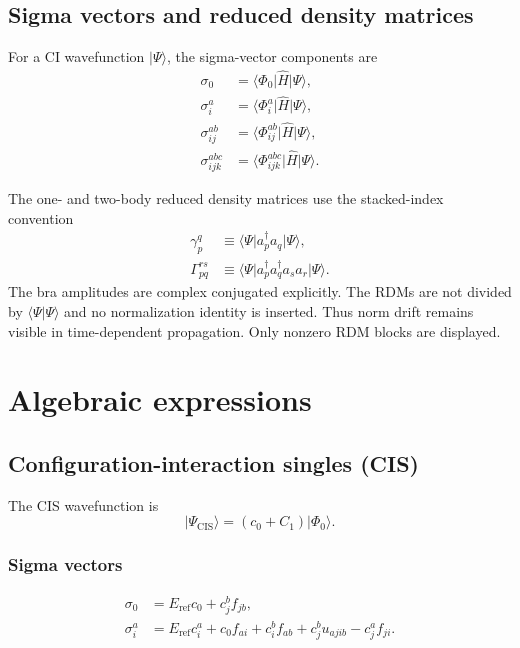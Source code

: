 \documentclass[11pt]{article}
\newcommand{\Eref}{E_{\mathrm{ref}}}
\newcommand{\cre}[1]{a_{#1}^{\dagger}}
\newcommand{\ann}[1]{a_{#1}}
\newcommand{\vac}{\Phi_0}
\begin{document}
\subsection{Sigma vectors and reduced density matrices}

For a CI wavefunction $\lvert\Psi\rangle$, the sigma-vector components are
\begin{align}
 \sigma_0
 &= \langle\vac\lvert\hat{H}\rvert\Psi\rangle,
 \\
 \sigma_i^a
 &= \langle\Phi_i^a\lvert\hat{H}\rvert\Psi\rangle,
 \\
 \sigma_{ij}^{ab}
 &= \langle\Phi_{ij}^{ab}\lvert\hat{H}\rvert\Psi\rangle,
 \\
 \sigma_{ijk}^{abc}
 &= \langle\Phi_{ijk}^{abc}\lvert\hat{H}\rvert\Psi\rangle.
\end{align}

The one- and two-body reduced density matrices use the stacked-index
convention
\begin{align}
 \gamma^q_p
 &\equiv
 \langle\Psi\lvert\cre{p}\ann{q}\rvert\Psi\rangle,
 \\
 \Gamma^{rs}_{pq}
 &\equiv
 \langle\Psi\lvert
 \cre{p}\cre{q}\ann{s}\ann{r}
 \rvert\Psi\rangle.
\end{align}
The bra amplitudes are complex conjugated explicitly.  The RDMs are not
divided by $\langle\Psi\vert\Psi\rangle$ and no normalization identity is
inserted.  Thus norm drift remains visible in time-dependent propagation.
Only nonzero RDM blocks are displayed.


\section{Algebraic expressions}

\subsection{Configuration-interaction singles (CIS)}

The CIS wavefunction is
\begin{equation}
 \lvert\Psi_{\mathrm{CIS}}\rangle
 = (c_0+C_1)\lvert\vac\rangle.
\end{equation}

\subsubsection{Sigma vectors}

\begin{align}
 \sigma_0
 &= \Eref c_0+c_j^b f_{jb},
 \\
 \sigma_i^a
 &= \Eref c_i^a+c_0f_{ai}+c_i^b f_{ab}
    +c_j^b u_{ajib}-c_j^a f_{ji}.
\end{align}
\end{document}
